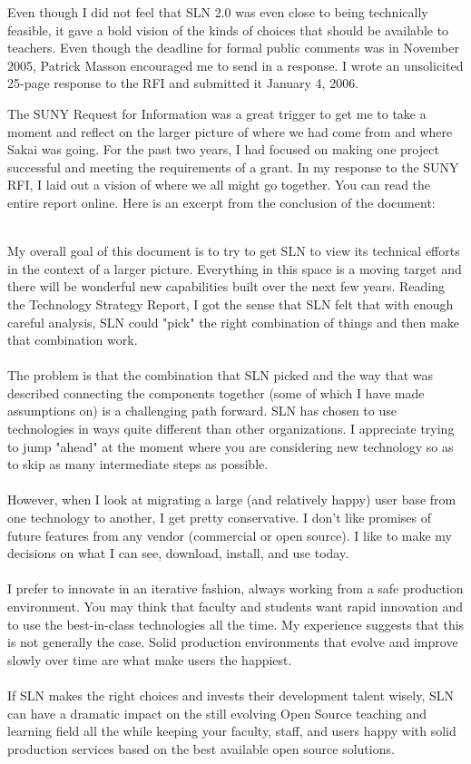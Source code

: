 \documentclass[12pt]{book}
\begin{document}
Even though I did not feel that SLN 2.0 was even close to being
technically feasible, it gave a bold vision of the kinds of
choices that should be available to teachers.  Even though
the deadline for formal public comments was in November
2005, Patrick Masson encouraged me to send in a response.
I wrote an unsolicited 25-page response
to the RFI and submitted it January 4, 2006.

The SUNY Request for Information was a great trigger to get
me to take a moment and reflect on the larger picture of
where we had come from and where Sakai was going.   For the past
two years, I had focused on making one project successful and
meeting the requirements of a grant.   In my response to the SUNY
RFI, I laid out a vision of where we all might go together.  You
can read the entire report online.  Here is an excerpt from
the conclusion of the document:\\
\\
\begin{sf}
My overall goal of this document is to try to get SLN to view its technical efforts in the context of a larger picture. Everything in this space is a moving target and there will be wonderful new capabilities built over the next few years. Reading the Technology Strategy Report, I got the sense that SLN felt that with enough careful analysis, SLN could "pick" the right combination of things and then make that combination work.\\
\\
The problem is that the combination that SLN picked and the way that was described connecting the components together (some of which I have made assumptions on) is a challenging path forward. SLN has chosen to use technologies in ways quite different than other organizations. I appreciate trying to jump "ahead" at the moment where you are considering new technology so as to skip as many intermediate steps as possible.\\
\\
However, when I look at migrating a large (and relatively happy) user base from one technology to another, I get pretty conservative. I don't like promises of future features from any vendor (commercial or open source). I like to make my decisions on what I can see, download, install, and use today.\\
\\
I prefer to innovate in an iterative fashion, always working from a safe production environment. You may think that faculty and students want rapid innovation and to use the best-in-class technologies all the time. My experience suggests that this is not generally the case. Solid production environments that evolve and improve slowly over time are what make users the happiest.\\
\\
If SLN makes the right choices and invests their development talent wisely, SLN can have a dramatic impact on the still evolving Open Source teaching and learning field all the while keeping your faculty, staff, and users happy with solid production services based on the best available open source solutions.\\
\end{sf}
\end{document}
